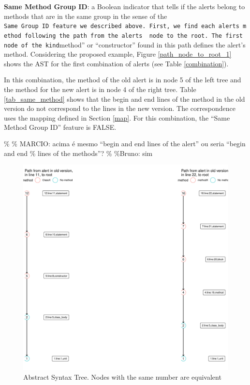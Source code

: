 \documentclass[
]{article}
\begin{document}
\normalsize \noindent \textbf{Same Method Group ID}: a Boolean indicator
that tells if the alerts belong to methods that are in the same group in
the sense of the
\texttt{Same\ Group\ ID\textquotesingle{}\textquotesingle{}\ feature\ we\ described\ above.\ First,\ we\ find\ each\ alert\textquotesingle{}s\ method\ following\ the\ path\ from\ the\ alert\textquotesingle{}s\ \ node\ to\ the\ root.\ The\ first\ node\ of\ the\ kind}method''
or ``constructor'' found in this path defines the alert's method.
Considering the proposed example, Figure \ref{path_node_to_root_1} shows
the AST for the first combination of alerts (see Table
\ref{combination}).

In this combination, the method of the old alert is in node 5 of the
left tree and the method for the new alert is in node 4 of the right
tree. Table \ref{tab_same_method} shows that the begin and end lines of
the method in the old version do not correspond to the lines in the new
version. The correspondence uses the mapping defined in Section
\ref{map}. For this combination, the ``Same Method Group ID'' feature is
FALSE.

\% \% MARCIO: acima é mesmo ``begin and end lines of the alert'' ou
seria ``begin and end \% lines of the methods''? \% \%Bruno: sim

\small

\begin{figure}[H]
\includegraphics[width=1\linewidth]{report_files/figure-latex/unnamed-chunk-8-1} \caption{Abstract Syntax Tree. Nodes with the same number are equivalent \label{path_node_to_root_1}}\label{fig:unnamed-chunk-8}
\end{figure}
\end{document}
